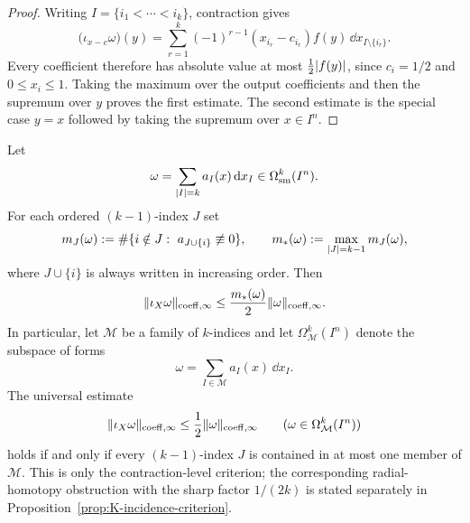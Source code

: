 \begin{proof}
Writing $I=\{i_1<\cdots<i_k\}$, contraction gives
\[
\bigl(\iota_{x-c}\omega\bigr)(y)
=
\sum_{r=1}^k
(-1)^{r-1}(x_{i_r}-c_{i_r})f(y)\,
\dd x_{I\setminus\{i_r\}} .
\]
Every coefficient therefore has absolute value at most
$\frac12\lvert f(y) \rvert$, since $c_i=1/2$ and $0\le x_i\le 1$. Taking the maximum
over the output coefficients and then the supremum over $y$ proves the first
estimate. The second estimate is the special case $y=x$ followed by taking
the supremum over $x\in I^n$.
\end{proof}

\begin{proposition}
\label{prop:incidence-criterion}
Let
\[
\omega=\sum_{\lvert I \rvert=k}a_I(x)\,\mathrm{d} x_I\in\Omega^k_{\mathrm{sm}}(I^n).
\]
For each ordered $(k-1)$-index $J$ set
\[
m_J(\omega):=\#\{i\notin J:\ a_{J\cup\{i\}}\not\equiv 0\},
\qquad
m_\ast(\omega):=\max_{\abs{J}=k-1}m_J(\omega),
\]
where $J\cup\{i\}$ is always written in increasing order. Then
\begin{equation}
\label{eq:incidence-contraction-bound}
\lVert \iota_X\omega \rVert_{\mathrm{coeff},\infty}
\le
\frac{m_\ast(\omega)}2\lVert \omega \rVert_{\mathrm{coeff},\infty}.
\end{equation}
In particular, let $\mathcal M$ be a family of $k$-indices and let
$\Omega^k_{\mathcal M}(I^n)$ denote the subspace of forms
\[
\omega=\sum_{I\in\mathcal M}a_I(x)\,\dd x_I .
\]
The universal estimate
\[
\lVert \iota_X\omega \rVert_{\mathrm{coeff},\infty}
\le
\frac12\lVert \omega \rVert_{\mathrm{coeff},\infty}
\qquad
(\omega\in\Omega^k_{\mathcal M}(I^n))
\]
holds if and only if every $(k-1)$-index $J$ is contained in at most one member
of $\mathcal M$. This is only the contraction-level criterion; the corresponding
radial-homotopy obstruction with the sharp factor $1/(2k)$ is stated separately
in Proposition~\ref{prop:K-incidence-criterion}.
\end{proposition}

